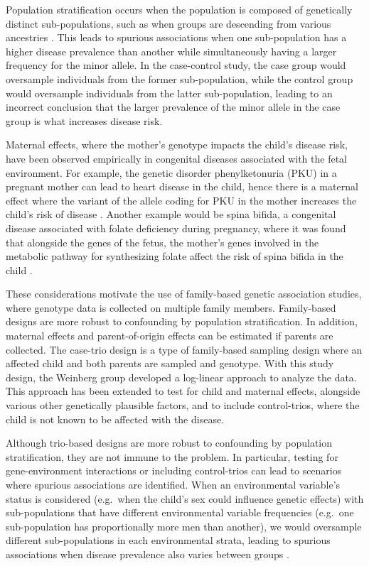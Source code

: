 Population stratification occurs when the population is composed of genetically distinct sub-populations, such as when groups are descending from various ancestries \cite{Hell+17}.
This leads to spurious associations \cite{CardPalm03} when one sub-population has a higher disease prevalence than another while simultaneously having a larger frequency for the minor allele.
In the case-control study, the case group would oversample individuals from the former sub-population, while the control group would oversample individuals from the latter sub-population, leading to an incorrect conclusion that the larger prevalence of the minor allele in the case group is what increases disease risk.

Maternal effects, where the mother's genotype impacts the child's disease risk, have been observed empirically in congenital diseases associated with the fetal environment.
For example, the genetic disorder phenylketonuria (PKU) in a pregnant mother can lead to heart disease in the child, hence there is a maternal effect where the variant of the allele coding for PKU in the mother increases the child's risk of disease \cite{Lee+05}.
Another example would be spina bifida, a congenital disease associated with folate deficiency during pregnancy, where it was found that alongside the genes of the fetus, the mother's genes involved in the metabolic pathway for synthesizing folate affect the risk of spina bifida in the child \cite{Hobbs+14}.

These considerations motivate the use of family-based genetic association studies, where genotype data is collected on multiple family members.
Family-based designs are more robust to confounding by population stratification.
In addition, maternal effects and parent-of-origin effects can be estimated if parents are collected.
The case-trio design is a type of family-based sampling design where an affected child and both parents are sampled and genotype.
With this study design, the Weinberg group developed a log-linear approach \cite{Wein+98, WeinUmba05, Wilc+98} to analyze the data.
This approach has been extended to test for child and maternal effects, alongside various other genetically plausible factors, and to include control-trios, where the child is not known to be affected with the disease.

Although trio-based designs are more robust to confounding by population stratification, they are not immune to the problem.
In particular, testing for gene-environment interactions or including control-trios can lead to scenarios where spurious associations are identified.
When an environmental variable's status is considered (e.g.\ when the child's sex could influence genetic effects) with sub-populations that have different environmental variable frequencies (e.g.\ one sub-population has proportionally more men than another), we would oversample different sub-populations in each environmental strata, leading to spurious associations when disease prevalence also varies between groups \cite{UmbaWein00}.

